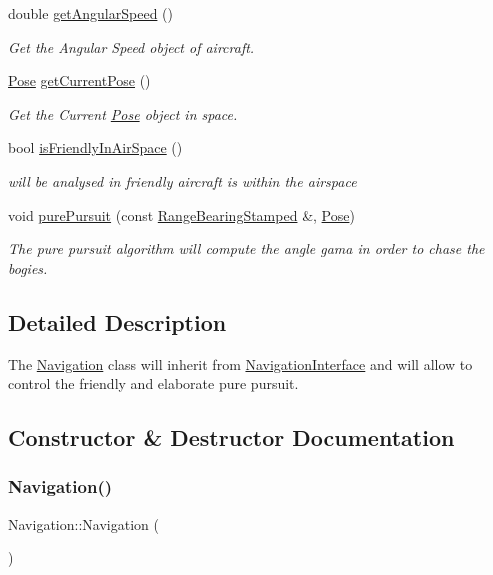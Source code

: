 \begin{DoxyCompactItemize}
double \hyperlink{classNavigation_a412ff177cefb3c4ddaf87daab3fe4c4c}{get\+Angular\+Speed} ()
\begin{DoxyCompactList}\small\item\em Get the Angular Speed object of aircraft. \end{DoxyCompactList}\item 
\hyperlink{structPose}{Pose} \hyperlink{classNavigation_af82fc8cc1546fa2a54e8a8651c1adc80}{get\+Current\+Pose} ()
\begin{DoxyCompactList}\small\item\em Get the Current \hyperlink{structPose}{Pose} object in space. \end{DoxyCompactList}\item 
bool \hyperlink{classNavigation_a4d4d752128c5069db8fcfd969dc22909}{is\+Friendly\+In\+Air\+Space} ()
\begin{DoxyCompactList}\small\item\em will be analysed in friendly aircraft is within the airspace \end{DoxyCompactList}\item 
void \hyperlink{classNavigation_a4f6dcaba60a955746a18760fdb418490}{pure\+Pursuit} (const \hyperlink{structRangeBearingStamped}{Range\+Bearing\+Stamped} \&, \hyperlink{structPose}{Pose})
\begin{DoxyCompactList}\small\item\em The pure pursuit algorithm will compute the angle gama in order to chase the bogies. \end{DoxyCompactList}\end{DoxyCompactItemize}


\subsection{Detailed Description}
The \hyperlink{classNavigation}{Navigation} class will inherit from \hyperlink{classNavigationInterface}{Navigation\+Interface} and will allow to control the friendly and elaborate pure pursuit. 

\subsection{Constructor \& Destructor Documentation}
\mbox{\label{classNavigation_a81fdffdefe46340da5fa6c570066b42b}} 
\subsubsection{\texorpdfstring{Navigation()}{Navigation()}}
{\footnotesize\ttfamily Navigation\+::\+Navigation (\begin{DoxyParamCaption}{ }\end{DoxyParamCaption})}



